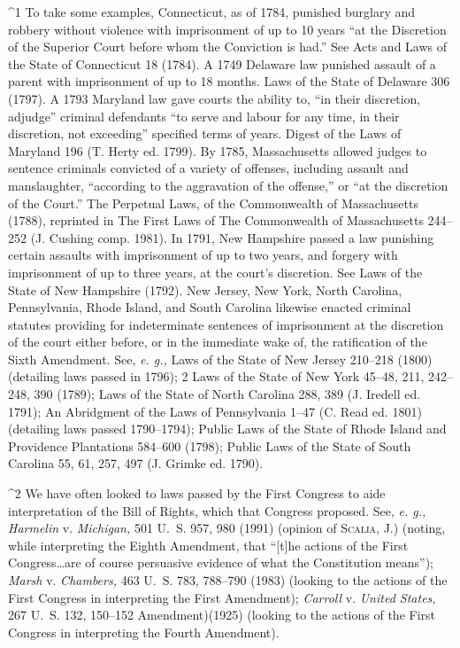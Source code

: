 ^1 To take some examples, Connecticut, as of 1784, punished burglary
and robbery without violence with imprisonment of up to 10 years ``at
the Discretion of the Superior Court before whom the Conviction is
had.'' See Acts and Laws of the State of Connecticut 18 (1784). A 1749
Delaware law punished assault of a parent with imprisonment of up to
18 months. Laws of the State of Delaware 306 (1797). A 1793 Maryland
law gave courts the ability to, ``in their discretion, adjudge''
criminal defendants ``to serve and labour for any time, in their
discretion, not exceeding'' specified terms of years. Digest of the
Laws of Maryland 196 (T. Herty ed. 1799). By 1785, Massachusetts
allowed judges to sentence criminals convicted of a variety of offenses,
including assault and manslaughter, ``according to the aggravation
of the offense,'' or ``at the discretion of the Court.'' The
Perpetual Laws, of the Commonwealth of Massachusetts (1788), reprinted
in The First Laws of The Commonwealth of Massachusetts 244--252 (J.
Cushing comp. 1981). In 1791, New Hampshire passed a law punishing
certain assaults with imprisonment of up to two years, and forgery
with imprisonment of up to three years, at the court's discretion.
See Laws of the State of New Hampshire (1792). New Jersey, New York,
North Carolina, Pennsylvania, Rhode Island, and South Carolina likewise
enacted criminal statutes providing for indeterminate sentences of
imprisonment at the discretion of the court either before, or in the
immediate wake of, the ratification of the Sixth Amendment. See,
\emph{e. g.,} Laws of the State of New Jersey 210--218 (1800) (detailing
laws passed in 1796); 2 Laws of the State of New York 45--48, 211,
242--248, 390 (1789); Laws of the State of North Carolina 288, 389 (J.
Iredell ed. 1791); An Abridgment of the Laws of Pennsylvania 1--47
(C. Read ed. 1801) (detailing laws passed 1790--1794); Public Laws of
the State of Rhode Island and Providence Plantations 584--600 (1798);
Public Laws of the State of South Carolina 55, 61, 257, 497 (J. Grimke
ed. 1790).

^2 We have often looked to laws passed by the First Congress to aide
interpretation of the Bill of Rights, which that Congress proposed.
See, \emph{e. g., Harmelin} v. \emph{Michigan,} 501 U.~S. 957, 980 (1991)
(opinion of \textsc{Scalia,} J.) (noting, while interpreting the Eighth
Amendment, that ``[t]he actions of the First Congress\dots are
of course persuasive evidence of what the Constitution means'');
\emph{Marsh} v. \emph{Chambers,} 463 U.~S. 783, 788--790 (1983) (looking
to the actions of the First Congress in interpreting the First \newpage 
Amendment); \emph{Carroll} v. \emph{United States,} 267 U.~S. 132, 150--152
Amendment)(1925) (looking to the actions of the First Congress in
interpreting the Fourth Amendment).

